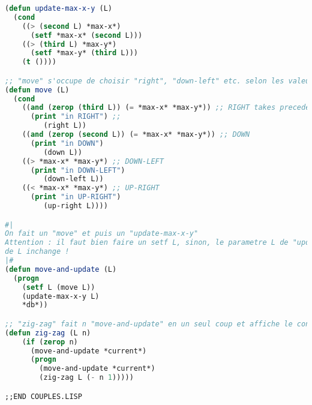 \documentclass{article}
\begin{document}
\begin{lstlisting}[language=Lisp, basicstyle=\footnotesize]
(defun update-max-x-y (L)
  (cond
    ((> (second L) *max-x*)
      (setf *max-x* (second L)))
    ((> (third L) *max-y*)
      (setf *max-y* (third L)))
    (t ())))

;; "move" s'occupe de choisir "right", "down-left" etc. selon les valeurs dans *current*
(defun move (L)
  (cond
    ((and (zerop (third L)) (= *max-x* *max-y*)) ;; RIGHT takes precedence over LEFT becuase it occurs first
      (print "in RIGHT") ;; 
         (right L))
    ((and (zerop (second L)) (= *max-x* *max-y*)) ;; DOWN
      (print "in DOWN") 
         (down L))
    ((> *max-x* *max-y*) ;; DOWN-LEFT
      (print "in DOWN-LEFT")  
         (down-left L))
    ((< *max-x* *max-y*) ;; UP-RIGHT
      (print "in UP-RIGHT") 
         (up-right L))))

#|
On fait un "move" et puis un "update-max-x-y"
Attention : il faut bien faire un setf L, sinon, le parametre L de "update-max-x-y utilise la valeur
de L inchange !
|#
(defun move-and-update (L)
  (progn
    (setf L (move L))
    (update-max-x-y L)
    *db*))

;; "zig-zag" fait n "move-and-update" en un seul coup et affiche le contenu de *db* (toutes les couples) 
(defun zig-zag (L n)
    (if (zerop n) 
      (move-and-update *current*)
      (progn
        (move-and-update *current*)
        (zig-zag L (- n 1)))))

;;END COUPLES.LISP

\end{lstlisting}
\end{document}
